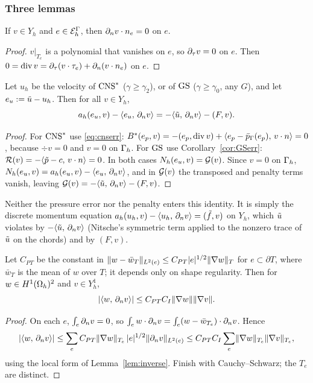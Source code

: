 

\subsubsection{Three lemmas}

\begin{lemma}\label{lb:normal}
If $v\in Y_h$ and $e\in\mathcal E_h^\Gamma$, then $\partial_n v\cdot n_e=0$ on $e$.
\end{lemma}

\begin{proof}
$v|_{T_e}$ is a polynomial that vanishes on $e$, so $\partial_\tau v=0$ on $e$. Then $0=\operatorname{div} v=\partial_\tau(v\cdot\tau_e)+\partial_n(v\cdot n_e)$ on $e$.
\end{proof}

\begin{lemma}\label{lb:identity}
Let $u_h$ be the velocity of $\mathrm{CNS}^\ast$ ($\gamma\ge\gamma_2$), or of $\mathrm{GS}$ ($\gamma\ge\gamma_0$, any $G$), and let $e_u:=\tilde u-u_h$. Then for all $v\in Y_h$,
\[
a_h(e_u,v)-\langle e_u,\, \partial_n v\rangle=-\langle \tilde u,\, \partial_n v\rangle-(F,v).
\]
\end{lemma}

\begin{proof}
For $\mathrm{CNS}^\ast$ use \eqref{eq:cnserr}: $B^\ast(e_p,v)=-(e_p,\operatorname{div} v)+\langle e_p-\bar p_{\Gamma}(e_p),\, v\cdot n\rangle=0$, because $\div v=0$ and $v=0$ on $\Gamma_h$. For $\mathrm{GS}$ use Corollary~\ref{cor:GSerr}: $\mathcal R(v)=-\langle \tilde p-c,\, v\cdot n\rangle=0$. In both cases $N_h(e_u,v)=\mathcal G(v)$. Since $v=0$ on $\Gamma_h$, $N_h(e_u,v)=a_h(e_u,v)-\langle e_u,\, \partial_n v\rangle$, and in $\mathcal G(v)$ the transposed and penalty terms vanish, leaving $\mathcal G(v)=-\langle \tilde u,\, \partial_n v\rangle-(F,v)$.
\end{proof}

Neither the pressure error nor the penalty enters this identity. It is simply the discrete momentum equation $a_h(u_h,v)-\langle u_h,\, \partial_n v\rangle=(\tilde f,v)$ on $Y_h$, which $\tilde u$ violates by $-\langle \tilde u,\, \partial_n v\rangle$ (Nitsche's symmetric term applied to the nonzero trace of $\tilde u$ on the chords) and by $(F,v)$.

\begin{lemma}\label{lb:poinc}
Let $C_{PT}$ be the constant in $\lVert w-\bar w_T\rVert_{L^2(e)}\le C_{PT}|e|^{1/2}\lVert \nabla w\rVert_{T}$ for $e\subset\partial T$, where $\bar w_T$ is the mean of $w$ over $T$; it depends only on shape regularity. Then for $w\in H^1(\Omega_h)^2$ and $v\in Y_h^1$,
\[
|\langle w,\, \partial_n v\rangle|\le C_{PT}C_I\lVert \nabla w\rVert\lVert \nabla v\rVert.
\]
\end{lemma}

\begin{proof}
On each $e$, $\int_e\partial_n v=0$, so $\int_e w\cdot\partial_n v=\int_e(w-\bar w_{T_e})\cdot\partial_n v$. Hence
\[
|\langle w,\, \partial_n v\rangle|\le\sum_e C_{PT}\lVert \nabla w\rVert_{T_e}\,|e|^{1/2}\lVert \partial_n v\rVert_{L^2(e)}\le C_{PT}C_I\sum_e\lVert \nabla w\rVert_{T_e}\lVert \nabla v\rVert_{T_e},
\]
using the local form of Lemma~\ref{lem:inverse}. Finish with Cauchy--Schwarz; the $T_e$ are distinct.
\end{proof}

